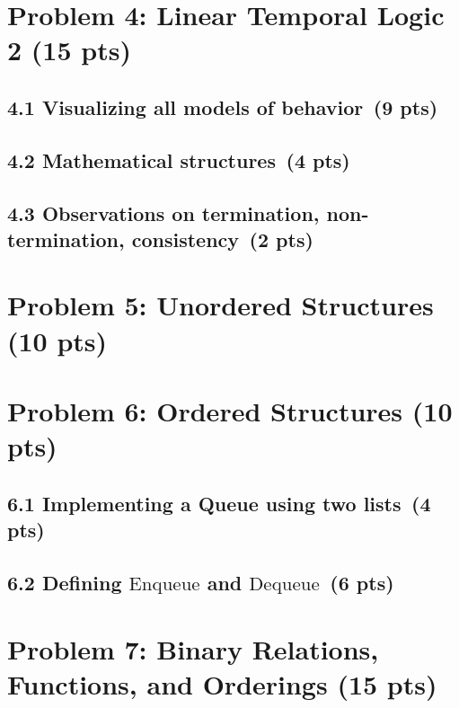 \documentclass[11pt]{article}
\begin{document}
\newpage
\section{Problem 4: Linear Temporal Logic 2 (15 pts)}

\subsection*{4.1 Visualizing all models of behavior \,(9 pts)}

\subsection*{4.2 Mathematical structures \,(4 pts)}

\subsection*{4.3 Observations on termination, non-termination, consistency \,(2 pts)}

\newpage
\section{Problem 5: Unordered Structures (10 pts)}


\newpage
\section{Problem 6: Ordered Structures (10 pts)}

\subsection*{6.1 Implementing a Queue using two lists \,(4 pts)}

\subsection*{6.2 Defining \(\text{Enqueue}\) and \(\text{Dequeue}\) \,(6 pts)}

\newpage
\section{Problem 7: Binary Relations, Functions, and Orderings (15 pts)}
\end{document}
